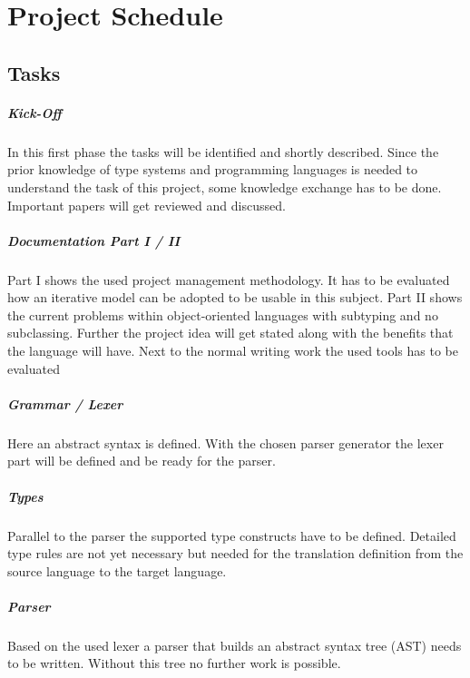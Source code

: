 \chapter{Project Schedule}
\section{Tasks}
\paragraph{Kick-Off}
In this first phase the tasks will be identified and shortly
described. Since the prior knowledge of type systems and programming
languages is needed to understand the task of this project, some
knowledge exchange has to be done. Important papers will get reviewed
and discussed.

\paragraph{Documentation Part I / II}
Part I shows the used project management methodology. It has to be
evaluated how an iterative model can be adopted to be usable in this
subject. Part II shows the current problems within object-oriented
languages with subtyping and no subclassing. Further the project idea
will get stated along with the benefits that the language will have. Next
to the normal writing work the used tools has to be evaluated

\paragraph{Grammar / Lexer}
Here an abstract syntax is defined. With the chosen parser generator
the lexer part will be defined and be ready for the parser.

\paragraph{Types}
Parallel to the parser the supported type constructs have to be
defined. Detailed type rules are not yet necessary but needed for the
translation definition from the source language to the target language.

\paragraph{Parser}
Based on the used lexer a parser that builds an abstract syntax tree
(AST) needs to be written. Without this tree no further work is possible.

